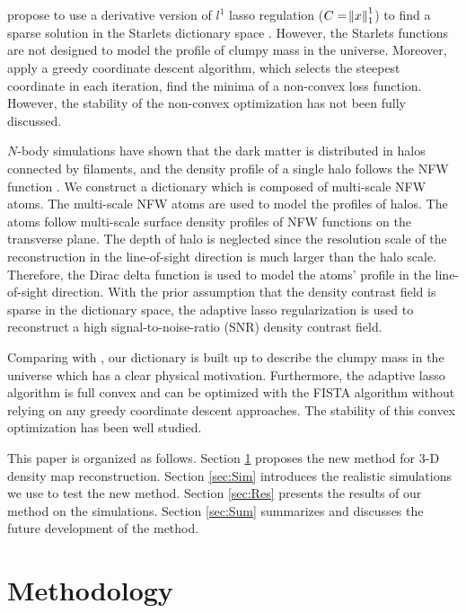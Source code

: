 \documentclass[twocolumn]{aastex62}
\begin{document}
\citet{LSS-massMap-Glimpse3D-Leonard2014} propose to use a derivative version of $l^1$ lasso regulation ($C=\norm{x}^1_1$) 
to find a sparse solution in the Starlets dictionary space \citep{Starlet-Starck2015}. However, the Starlets functions are 
not designed to model the profile of clumpy mass in the universe. Moreover, \citet{LSS-massMap-Glimpse3D-Leonard2014} 
apply a greedy coordinate descent algorithm, which selects the steepest coordinate in each iteration, find the minima of 
a non-convex loss function. However, the stability of the non-convex optimization has not been fully discussed.

$N$-body simulations have shown that the dark matter is distributed in halos connected by filaments, and the density 
profile of a single halo follows the NFW function \citep{halo-NFW1997ApJ}.
We construct a dictionary which is composed of multi-scale NFW atoms. The multi-scale NFW atoms are used to model the 
profiles of halos. The atoms follow multi-scale surface density profiles of NFW functions \citep{haloModel-TJ2003-3pt}
on the transverse plane.
The depth of halo is neglected \citep{LSS-massMap-Glimpse3D-Leonard2014} since the resolution scale of the reconstruction 
in the line-of-sight direction is much larger than the halo scale. Therefore, the Dirac delta function is used to model the
atoms' profile in the line-of-sight direction. 
With the prior assumption that the density contrast field is sparse in the dictionary space, the adaptive lasso regularization
\citep{AdaLASSO-Zou2006} is used to reconstruct a high signal-to-noise-ratio (SNR) density contrast field.

Comparing with \citet{LSS-massMap-Glimpse3D-Leonard2014}, our dictionary is built up to describe the clumpy mass 
in the universe which has a clear physical motivation. Furthermore, the adaptive lasso algorithm is full convex and 
can be optimized with the FISTA algorithm \citep{FISTA-Beck2009} without relying on any greedy coordinate descent approaches. 
The stability of this convex optimization has been well studied.

This paper is organized as follows.
Section \ref{sec:Method} proposes the new method for $3$-D density map reconstruction.
Section \ref{sec:Sim} introduces the realistic simulations we use to test the new method.
Section \ref{sec:Res} presents the results of our method on the simulations.
Section \ref{sec:Sum} summarizes and discusses the future development of the method.

\section{Methodology}
\label{sec:Method}
\end{document}
